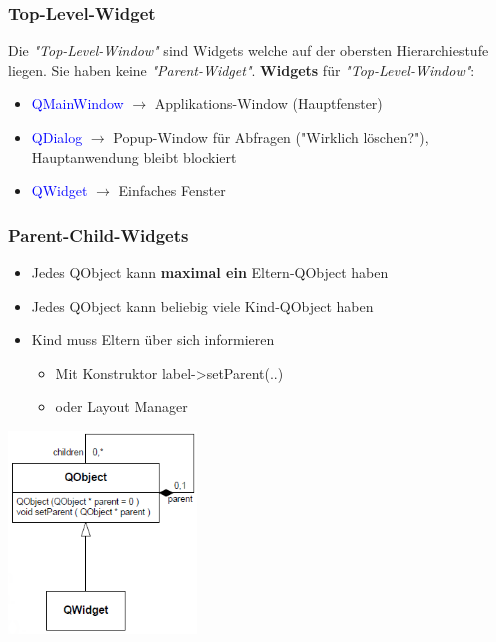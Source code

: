 \begin{multicols}{3}
\subsubsection{Top-Level-Widget}
Die \textit{"Top-Level-Window"} sind Widgets welche auf der obersten \newline Hierarchiestufe liegen. Sie haben \newline keine \textit{"Parent-Widget"}.\newline
\textbf{Widgets} für \textit{"Top-Level-Window"}: 
\begin{itemize}
	\item \textcolor{blue}{QMainWindow} $\rightarrow$ Applikations-Window (Hauptfenster)
	\item \textcolor{blue}{QDialog} $\rightarrow$ Popup-Window für Abfragen ("Wirklich löschen?"), Hauptanwendung bleibt blockiert
	\item \textcolor{blue}{QWidget} $\rightarrow$ Einfaches Fenster
\end{itemize}

\subsubsection{Parent-Child-Widgets}
\begin{itemize}
	\item Jedes QObject kann \textbf{maximal ein} Eltern-QObject haben
	\item Jedes QObject kann beliebig \newline viele Kind-QObject haben
	\item Kind muss Eltern über sich \newline informieren
    \begin{itemize}
	\item Mit Konstruktor
    \subitem label->setParent(..)
    \item oder Layout Manager
    \end{itemize}
\end{itemize}

\includegraphics[width=5cm]{images/qt_parent_child.png}
\end{multicols}

